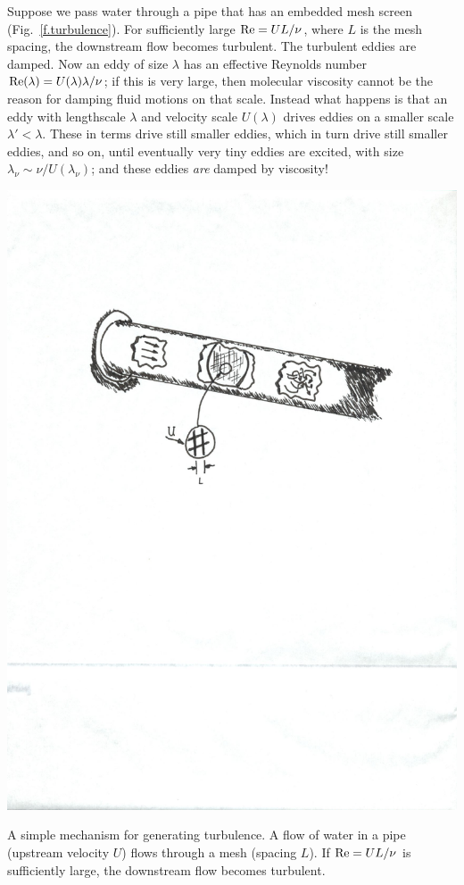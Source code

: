 Suppose we pass water through a pipe that has an embedded mesh screen (Fig.~\ref{f.turbulence}).  For sufficiently large $\mathrm{Re} = UL/\nu$, where $L$ is the mesh spacing, the downstream flow becomes turbulent. The turbulent eddies are damped.  Now an eddy of size $\lambda$ has an effective Reynolds number $\mathrm{Re}(\lambda) = U(\lambda)\lambda/\nu$; if this is very large, then molecular viscosity cannot be the reason for damping fluid motions on that scale. Instead what happens is that an eddy with lengthscale $\lambda$ and velocity scale $U(\lambda)$ drives eddies on a smaller scale $\lambda' < \lambda$. These in terms drive still smaller eddies, which in turn drive still smaller eddies, and so on, until eventually very tiny eddies are excited, with size $\lambda_{\nu} \sim \nu/U(\lambda_{\nu})$; and these eddies \emph{are} damped by viscosity!

\begin{marginfigure}
\includegraphics[width=\textwidth]{turbulence-maker}
\caption[A simple mechanism for generating turbulence.]{\label{f.turbulence} A simple mechanism for generating turbulence. A flow of water in a pipe (upstream velocity $U$) flows through a mesh (spacing $L$).  If $\mathrm{Re} = UL/\nu$ is sufficiently large, the downstream flow becomes turbulent. }
\end{marginfigure}


